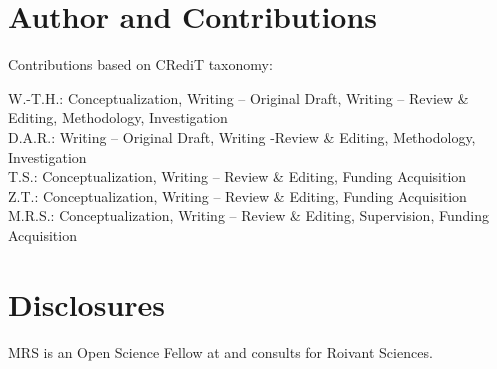 \documentclass[sn-vancouver]{sn-jnl}
\begin{document}
\section{Author and Contributions}
Contributions based on CRediT taxonomy:

\noindent W.-T.H.: Conceptualization, Writing – Original Draft, Writing – Review \& Editing, Methodology, Investigation \\
D.A.R.: Writing – Original Draft, Writing -Review \& Editing, Methodology, Investigation  \\
T.S.: Conceptualization, Writing – Review \& Editing, Funding Acquisition \\
Z.T.: Conceptualization, Writing – Review \& Editing, Funding Acquisition \\
M.R.S.: Conceptualization, Writing – Review \& Editing, Supervision, Funding Acquisition \\

\section{Disclosures}
MRS is an Open Science Fellow at and consults for Roivant Sciences.



\clearpage

\clearpage
\end{document}
